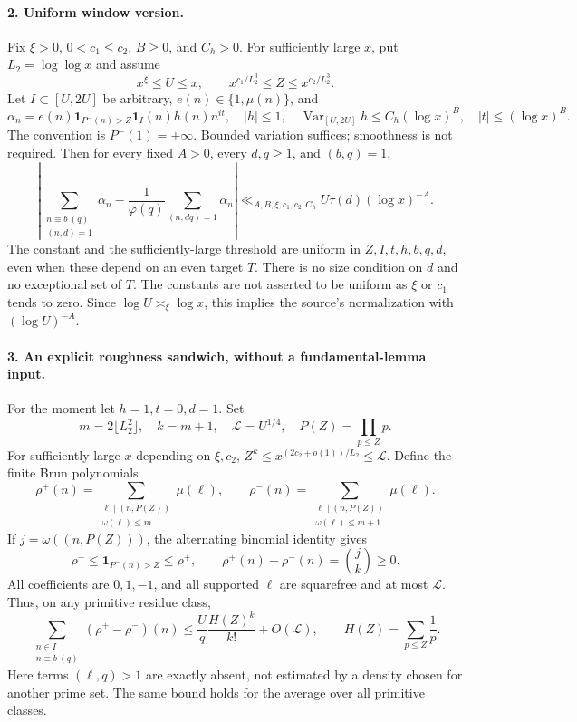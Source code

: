 \paragraph{2. Uniform window version.}
Fix $\xi>0$, $0<c_1\le c_2$, $B\ge0$, and $C_h>0$. For sufficiently
large $x$, put $L_2=\log\log x$ and assume
\[
 x^\xi\le U\le x,\qquad
 x^{c_1/L_2^3}\le Z\le x^{c_2/L_2^3}.
\]
Let $I\subset[U,2U]$ be arbitrary, $e(n)\in\{1,\mu(n)\}$, and
\[
 \alpha_n=e(n)\mathbf1_{P^-(n)>Z}\mathbf1_I(n)h(n)n^{it},
 \quad |h|\le1,\quad \operatorname{Var}_{[U,2U]}h\le C_h(\log x)^B,
 \quad |t|\le(\log x)^B.
\]
The convention is $P^-(1)=+\infty$. Bounded variation suffices; smoothness
is not required. Then for every fixed $A>0$, every $d,q\ge1$, and
$(b,q)=1$,
\begin{equation}\label{eq:hb-rough-full-sw-20261009}
 \left|\sum_{\substack{n\equiv b\ (q)\\(n,d)=1}}\alpha_n
 -\frac1{\varphi(q)}\sum_{(n,dq)=1}\alpha_n\right|
 \ll_{A,B,\xi,c_1,c_2,C_h}
       U\tau(d)(\log x)^{-A}.
\end{equation}
The constant and the sufficiently-large threshold are uniform in
$Z,I,t,h,b,q,d$, even when these depend on an even target $T$.
There is no size condition on $d$ and no exceptional set of $T$.
The constants are not asserted to be uniform as $\xi$ or $c_1$ tends
to zero. Since $\log U\asymp_\xi\log x$, this implies the source's
normalization with $(\log U)^{-A}$.

\paragraph{3. An explicit roughness sandwich, without a fundamental-lemma input.}
For the moment let $h=1,t=0,d=1$. Set
\[
 m=2\lfloor L_2^2\rfloor,\quad k=m+1,\quad \mathcal L=U^{1/4},
 \quad P(Z)=\prod_{p\le Z}p.
\]
For sufficiently large $x$ depending on $\xi,c_2$,
$Z^k\le x^{(2c_2+o(1))/L_2}\le\mathcal L$.
Define the finite Brun polynomials
\[
 \rho^+(n)=\sum_{\substack{\ell\mid(n,P(Z))\\\omega(\ell)\le m}}\mu(\ell),
 \qquad
 \rho^-(n)=\sum_{\substack{\ell\mid(n,P(Z))\\\omega(\ell)\le m+1}}\mu(\ell).
\]
If $j=\omega((n,P(Z)))$, the alternating binomial identity gives
\[
 \rho^-\le\mathbf1_{P^-(n)>Z}\le\rho^+,
 \qquad \rho^+(n)-\rho^-(n)=\binom{j}{k}\ge0.                 \tag{R1}
\]
All coefficients are $0,1,-1$, and all supported $\ell$ are squarefree
and at most $\mathcal L$. Thus, on any primitive residue class,
\[
 \sum_{\substack{n\in I\\n\equiv b\ (q)}}(\rho^+-\rho^-)(n)
 \le \frac{U}{q}\frac{H(Z)^k}{k!}+O(\mathcal L),
 \qquad H(Z)=\sum_{p\le Z}\frac1p.                           \tag{R2}
\]
Here terms $(\ell,q)>1$ are exactly absent, not estimated by a density
chosen for another prime set. The same bound holds for the average
over all primitive classes.

